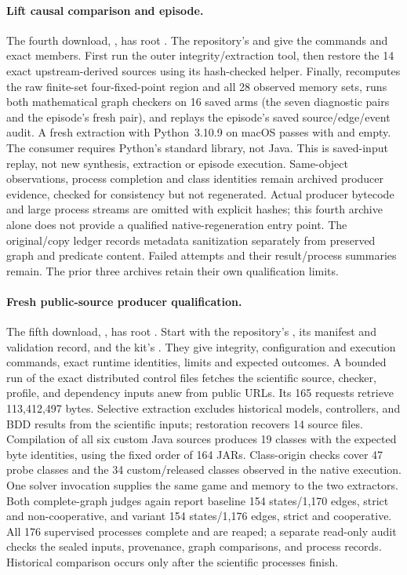 \paragraph{Lift causal comparison and episode.}
The fourth download,
, has root
.
The repository's  and
 give the commands and exact members.
First run the outer integrity/extraction tool, then restore the
14 exact upstream-derived sources using its hash-checked helper.
Finally,  recomputes the raw finite-set
four-fixed-point region and all 28 observed memory sets, runs both
mathematical graph checkers on 16 saved arms (the seven diagnostic pairs
and the episode's fresh pair), and replays the episode's saved
source/edge/event audit. A fresh extraction with Python~3.10.9 on
macOS passes with  and  empty.
The consumer requires Python's standard library, not Java.
This is saved-input replay, not new synthesis, extraction or episode
execution. Same-object observations, process completion and class
identities remain archived producer evidence, checked for consistency
but not regenerated. Actual producer bytecode and large process streams
are omitted with explicit hashes; this fourth archive alone does not
provide a qualified native-regeneration entry point. The original/copy ledger records
metadata sanitization separately from preserved graph and predicate
content. Failed attempts and their result/process summaries remain.
The prior three archives retain their own qualification limits.

\paragraph{Fresh public-source producer qualification.}
The fifth download,
, has root
.
Start with the repository's , its
manifest and validation record, and the kit's .
They give integrity, configuration and execution commands, exact runtime
identities, limits and expected outcomes. A bounded run of the exact
distributed control files fetches the scientific source, checker, profile,
and dependency inputs anew from public URLs. Its 165 requests retrieve
113,412,497 bytes. Selective extraction excludes historical models,
controllers, and BDD results from the scientific inputs; restoration
recovers 14 source files. Compilation of all six custom Java sources
produces 19 classes with the expected byte identities, using the fixed
order of 164 JARs. Class-origin checks cover 47 probe classes and the
34 custom/released classes observed in the native execution.
One solver invocation supplies the same game and memory to the two
extractors. Both complete-graph judges again report baseline
154 states/1,170 edges, strict and non-cooperative, and variant
154 states/1,176 edges, strict and cooperative. All 176 supervised
processes complete and are reaped; a separate read-only audit checks
the sealed inputs, provenance, graph comparisons, and process records.
Historical comparison occurs only after the scientific processes finish.

